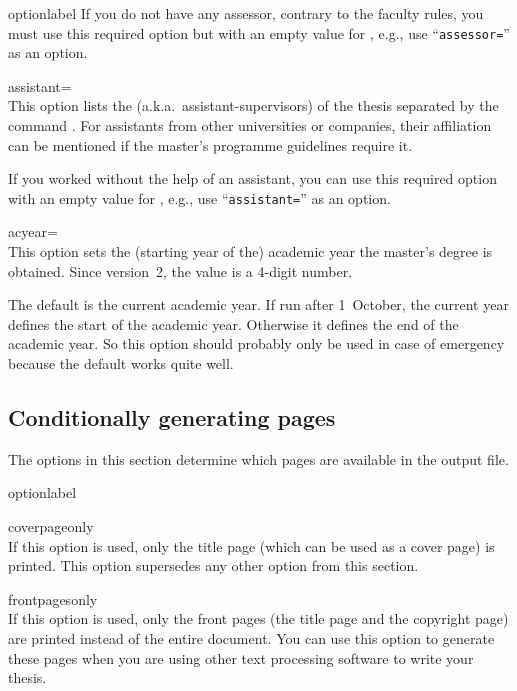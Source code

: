 \begin{labelled}{optionlabel}
  If you do not have any assessor, contrary to the faculty rules, you must use
  this required option but with an empty value for , e.g., use
  ``\verb"assessor="'' as an option.

\item[assistant=\meta{assistants}]
  \\
  This option lists the  (a.k.a.\ assistant-supervisors) of
  the thesis separated by the command . For assistants from other
  universities or companies, their affiliation can be mentioned if the master's
  programme guidelines require it.

  If you worked without the help of an assistant, you can use this required
  option with an empty value for , e.g., use
  ``\verb"assistant="'' as an option.

\item[acyear=\meta{acyear}]\\
  This option sets the (starting year of the) academic year the master's degree
  is obtained.
  Since version~2, the value  is a 4-digit number.

  The default is the current academic year. If run after 1~October, the current
  year defines the start of the academic year. Otherwise it defines the end of
  the academic year. So this option should probably only be used in case of
  emergency because the default works quite well.
\end{labelled}

\subsection{Conditionally generating pages}
The options in this section determine which pages are available in the
output file.

\begin{labelled}{optionlabel}
\item[coverpageonly]\\
  If this option is used, only the title page (which can be used as a cover
  page) is printed. This option supersedes any other option from this section.

\item[frontpagesonly]\\
  If this option is used, only the front pages (the title page and the
  copyright page) are printed instead of the entire document. You can use this
  option to generate these pages when you are using other text processing
  software to write your thesis.
\end{labelled}


